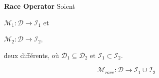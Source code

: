 %

\begin{definition}\label{op:race}
{\bf Race Operator} Soient
\begin{inparaenum}[i)]
	\item $\mathcal{M}_1 : \mathcal{D} \rightarrow \mathcal{I}_1$  et
	\item $\mathcal{M}_2 : \mathcal{D} \rightarrow \mathcal{I}_2$,
\end{inparaenum} deux \ms{} différents, où $\mathcal{D}_1 \subseteq \mathcal{D}_2$ et $\mathcal{I}_1 \subset \mathcal{I}_2$. 

\[
\mathcal{M}_{race}:\mathcal{D} \rightarrow \mathcal{I}_1 \cup \mathcal{I}_2 
\]
\end{definition}

